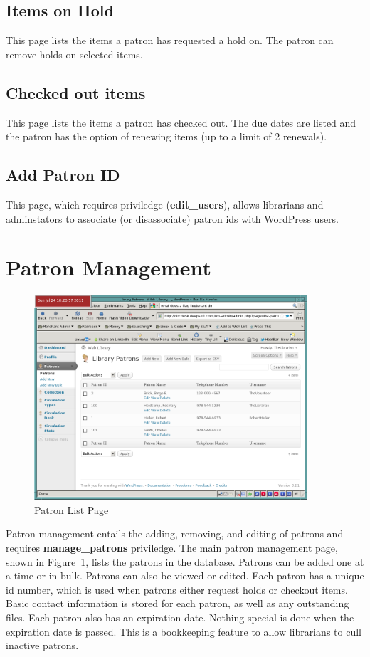 \documentclass[letterpaper,twoside]{article}
\begin{document}
\subsection{Items on Hold}
This page lists the items a patron has requested a hold on.  The patron
can remove holds on selected items.

\subsection{Checked out items}
This page lists the items a patron has checked out. The due dates are
listed and the patron has the option of renewing items (up to a limit of
2 renewals).

\subsection{Add Patron ID} This page, which requires priviledge
(\textbf{edit\_users}), allows librarians and adminstators to associate
(or disassociate) patron ids with WordPress users.

\section{Patron Management}

\begin{figure}[htbp]
\begin{centering}
\includegraphics[width=4in]{PatronManagement.png}
\caption{Patron List Page}
\label{fig:PatronList}
\end{centering}
\end{figure}
Patron management entails the adding, removing, and editing of patrons
and requires \textbf{manage\_patrons} priviledge.  The main patron
management page, shown in Figure~\ref{fig:PatronList}, lists the
patrons in the database. Patrons can be added one at a time or in bulk.
Patrons can also be viewed or edited.  Each patron has a unique id
number, which is used when patrons either request holds or checkout
items.  Basic contact information is stored for each patron, as well as
any outstanding files.  Each patron also has an expiration date.
Nothing special is done when the expiration date is passed.  This is a
bookkeeping feature to allow librarians to cull inactive patrons.
\end{document}
